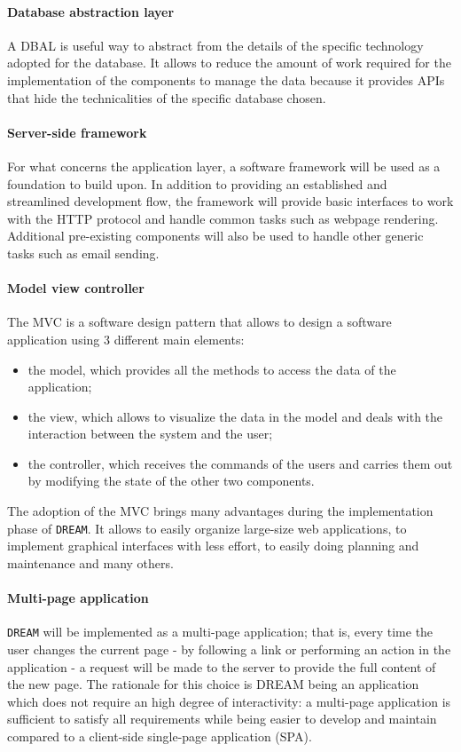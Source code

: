 \documentclass{article}
\begin{document}
\paragraph{Database abstraction layer}
A DBAL is useful way to abstract from the details of the specific technology adopted for the database. It allows to reduce the amount of work required for the implementation of the components to manage the data because it provides APIs that hide the technicalities of the specific database chosen.
\paragraph{Server-side framework}
For what concerns the application layer, a software framework will be used as a foundation to build upon. In addition to providing an established and streamlined development flow, the framework will provide basic interfaces to work with the HTTP protocol and handle common tasks such as webpage rendering. Additional pre-existing components will also be used to handle other generic tasks such as email sending.
\paragraph{Model view controller}
The MVC is a software design pattern that allows to design a software application using 3 different main elements:
\begin{itemize}
    \item the model, which provides all the methods to access the data of the application;
    \item the view, which allows to visualize the data in the model and deals with the interaction between the system and the user;
    \item the controller, which receives the commands of the users and carries them out by modifying the state of the other two components.
\end{itemize}
The adoption of the MVC brings many advantages during the implementation phase of \verb|DREAM|. It allows to easily organize large-size web applications, to implement graphical interfaces with less effort, to easily doing planning and maintenance and many others.
\paragraph{Multi-page application}
\verb|DREAM| will be implemented as a multi-page application; that is, every time the user changes the current page - by following a link or performing an action in the application - a request will be made to the server to provide the full content of the new page. \newline
The rationale for this choice is DREAM being an application which does not require an high degree of interactivity: a multi-page application is sufficient to satisfy all requirements while being easier to develop and maintain compared to a client-side single-page application (SPA).
\end{document}
